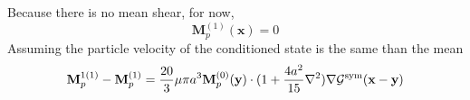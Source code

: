 \documentclass[12pt]{My_preprint}
\begin{document}
Because there is no mean shear, for now, 
\begin{equation}
    \textbf{M}_p^{(1)}(\textbf{x})
    =
    0
\end{equation}
Assuming the particle velocity of the conditioned state is the same than the mean 
\begin{equation}
    \textbf{M}_p^{1(1)} - \textbf{M}_p^{(1)}
    =
    \frac{20}{3} \mu \pi a^3
    \textbf{M}_p^{(0)}(\textbf{y})\cdot
    (1 + \frac{4a^2}{15}\mathbf{\nabla}^2 )\mathbf{\nabla}\mathcal{G}^\text{sym}(\textbf{x}-\textbf{y})
\end{equation}


% 

\appendix
\end{document}
